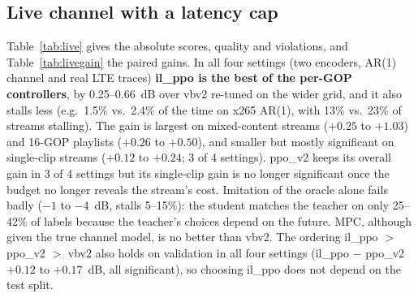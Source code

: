 \documentclass[conference]{IEEEtran}
\begin{document}
\subsection{Live channel with a latency cap}
Table~\ref{tab:live} gives the absolute scores, quality and violations, and Table~\ref{tab:livegain} the paired gains. In all four settings (two encoders, AR(1) channel and real LTE traces) \textbf{il\_ppo is the best of the per-GOP controllers}, by 0.25--0.66~dB over vbv2 re-tuned on the wider grid, and it also stalls less (e.g.\ 1.5\% vs.\ 2.4\% of the time on x265 AR(1), with 13\% vs.\ 23\% of streams stalling). The gain is largest on mixed-content streams ($+0.25$ to $+1.03$) and 16-GOP playlists ($+0.26$ to $+0.50$), and smaller but mostly significant on single-clip streams ($+0.12$ to $+0.24$; 3 of 4 settings). ppo\_v2 keeps its overall gain in 3 of 4 settings but its single-clip gain is no longer significant once the budget no longer reveals the stream's cost. Imitation of the oracle alone fails badly ($-1$ to $-4$~dB, stalls 5--15\%): the student matches the teacher on only 25--42\% of labels because the teacher's choices depend on the future. MPC, although given the true channel model, is no better than vbv2. The ordering il\_ppo $>$ ppo\_v2 $>$ vbv2 also holds on validation in all four settings (il\_ppo $-$ ppo\_v2 $+0.12$ to $+0.17$~dB, all significant), so choosing il\_ppo does not depend on the test split.

\begin{table}[t]
\caption{Live channel, test streams of 8 GOPs, fixed-ladder budget. Score $S$ (dB) / $\Delta$PSNR$_B$ (dB) / \% of duration stalled. Over-budget rate is 1--7\% for every method except il (18--21\%).}
\label{tab:live}
\centering\footnotesize\setlength{\tabcolsep}{2.2pt}
\end{table}
\end{document}
